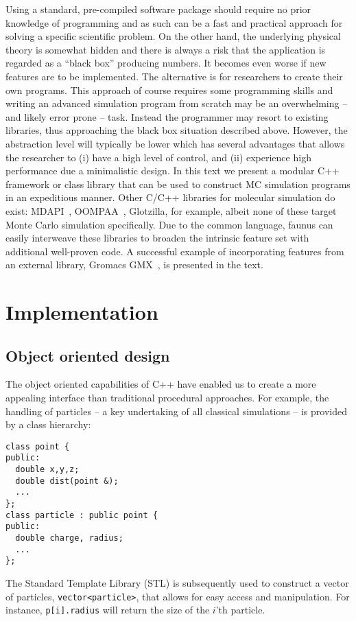 \documentclass[10pt]{bmc_article}
\newenvironment{bmcformat}{\begin{raggedright}\baselineskip20pt\sloppy\setboolean{publ}{false}}{\end{raggedright}\baselineskip20pt\sloppy}
\begin{document}
\begin{bmcformat}
Using a standard, pre-compiled software package should require no prior knowledge of programming and as such can be a fast and practical approach for solving a specific scientific problem.
On the other hand, the underlying physical theory is somewhat hidden and there is always a risk that the application is regarded as a ``black box'' producing numbers. It becomes even worse if new features are to be implemented.
The alternative is for researchers to create their own programs. This approach of course requires some programming skills and writing an advanced simulation program from scratch may be an overwhelming -- and likely error prone -- task.
Instead the programmer may resort to existing libraries, thus approaching the black box situation described above. However, the abstraction level will typically be lower which has several advantages that allows the researcher to
(i) have a high level of control, and
(ii) experience high performance due a minimalistic design.
In this text we present a modular C++~\cite{stroustrup:97} framework or class library that can be used to construct MC simulation programs in an expeditious manner.
Other C/C++ libraries for molecular simulation do exist: MDAPI~\cite{mdapi}, OOMPAA~\cite{oompaa}, Glotzilla, for example, albeit none of these target Monte Carlo simulation specifically.
Due to the common language, faunus can easily interweave these libraries to broaden the intrinsic feature set with additional well-proven code.
A successful example of incorporating features from an external library, Gromacs GMX~\cite{gromacs}, is presented in the text.

%
\section*{Implementation}
\subsection*{Object oriented design}
The object oriented capabilities of C++ have enabled us to create a
more appealing interface than traditional procedural approaches.
For example, the handling of particles -- a key undertaking of all classical simulations -- is provided by a class hierarchy:
\begin{verbatim}
class point {
public:
  double x,y,z;
  double dist(point &);
  ...
};
class particle : public point {
public:
  double charge, radius;
  ...
};
\end{verbatim}
The Standard Template Library (STL) is subsequently used to construct a vector of particles, \verb"vector<particle>", that allows for easy access and manipulation.
For instance, \verb"p[i].radius" will return the size of the $i$'th particle.


\end{bmcformat}
\end{document}
